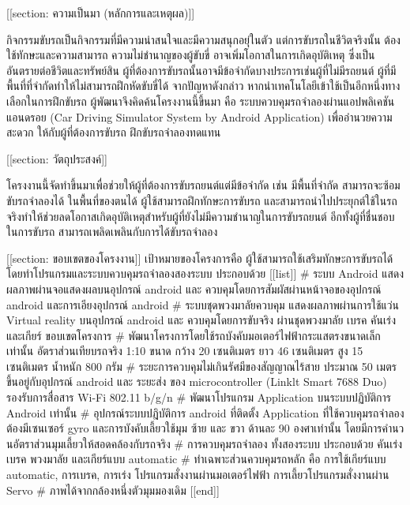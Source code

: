 [[section: ความเป็นมา (หลักการและเหตุผล)]] 

กิจกรรมขับรถเป็นกิจกรรมที่มีความน่าสนใจและมีความสนุกอยุ่ในตัว แต่การขับรถในชีวิตจริงนั้น ต้องใช้ทักษะและความสามารถ ความไม่ชำนาญของผู้ขับขี่  อาจเพิ่มโอกาสในการเกิดอุบัติเหตุ ซึ่งเป็นอันตรายต่อชีวิตและทรัพย์สิน ผู้ที่ต้องการขับรถนั้นอาจมีข้อจำกัดบางประการเช่นผู้ที่ไม่มีรถยนต์ ผู้ที่มีพื้นที่ที่จำกัดทำให้ไม่สามารถฝึกหัดขับขี่ได้ 
จากปัญหาดังกล่าว หากนำเทคโนโลยีเข้าใช้เป็นอีกหนึ่งทางเลือกในการฝึกขับรถ ผู้พัฒนาจึงคิดค้นโครงงานนี้ขึ้นมา คือ ระบบควบคุมรถจำลองผ่านแอปพลิเคชันแอนดรอย (Car Driving Simulator System by Android Application) เพื่ออำนวยความสะดวก ให้กับผู้ที่ต้องการขับรถ ฝึกขับรถจำลองทดแทน 

[[section: วัตถุประสงค์]]

โครงงานนี้จัดทำขึ้นมาเพื่อช่วยให้ผู้ที่ต้องการขับรถยนต์แต่มีข้อจำกัด  เช่น มีพื้นที่จำกัด  สามารถจะซ้อมขับรถจำลองได้ ในพื้นที่ของตนได้ ผู้ใช้สามารถฝึกทักษะการขับรถ และสามารถนำไปประยุกต์ใช้ในรถจริงทำให้ช่วยลดโอกาสเกิดอุบัติเหตุสำหรับผู้ที่ยังไม่มีความชำนาญในการขับรถยนต์  อีกทั้งผู้ที่ชื่นชอบในการขับรถ สามารถเพลิดเพลินกับการได้ขับรถจำลอง


[[section: ขอบเขตของโครงงาน]] 
เป้าหมายของโครงการคือ ผู้ใช้สามารถใช้เสริมทักษะการขับรถได้ โดยทำโปรแกรมและระบบควบคุมรถจำลองสองระบบ ประกอบด้วย
[[list]]
# ระบบ Android แสดงผลภาพผ่านจอแสดงผลบนอุปกรณ์ android และ ควบคุมโดยการสัมผัสผ่านหน้าจอของอุปกรณ์ android และการเอียงอุปกรณ์ android
# ระบบชุดพวงมาลัยควบคุม แสดงผลภาพผ่านการใช้แว่น Virtual reality บนอุปกรณ์ android  และ ควบคุมโดยการขับจริง ผ่านชุดพวงมาลัย เบรค คันเร่ง และเกียร์
ขอบเขตโครงการ
# พัฒนาโครงการโดยใช้รถบังคับมอเตอร์ไฟฟ้ากระแสตรงขนาดเล็กเท่านั้น อัตราส่วนเทียบรถจริง 1:10  ขนาด กว้าง 20 เซนติเมตร  ยาว 46 เซนติเมตร สูง 15 เซนติเมตร น้ำหนัก 800 กรัม
# ระยะการควบคุมไม่เกินรัศมีของสัญญาณไร้สาย ประมาณ 50 เมตร ขึ้นอยู่กับอุปกรณ์ android และ ระยะส่ง ของ microcontroller (Linklt Smart 7688 Duo) รองรับการสื่อสาร Wi-Fi 802.11 b/g/n
# พัฒนาโปรแกรม Application บนระบบปฏิบัติการ Android  เท่านั้น
# อุปกรณ์ระบบปฎิบัติการ android ที่ติดตั้ง Application ที่ใช้ควบคุมรถจำลองต้องมีเซนเซอร์ gyro และการบังคับเลี้ยวใช้มุม ซ้าย และ ขวา ด้านละ 90 องศาเท่านั้น โดยมีการคำนวนอัตราส่วนมุมเลี้ยวให้สอดคล้องกับรถจริง
# การควบคุมรถจำลอง ทั้งสองระบบ ประกอบด้วย คันเร่ง เบรค พวงมาลัย และเกียร์แบบ automatic
# ทำเฉพาะส่วนควบคุมรถหลัก คือ การใช้เกียร์แบบ automatic, การเบรค, การเร่ง โปรแกรมสั่งงานผ่านมอเตอร์ไฟฟ้า  การเลี้ยวโปรแกรมสั่งงานผ่าน Servo
# ภาพได้จากกล้องหนึ่งตัวมุมมองเดิม
[[end]]

